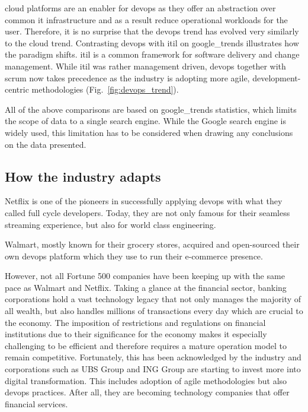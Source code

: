 \documentclass[../main.tex]{subfiles}
\begin{document}
    \Gls{cloud} platforms are an enabler for \gls{devops} as they offer an abstraction over common \acrshort{it} infrastructure and as a result reduce operational workloads for the user.
    Therefore, it is no surprise that the \gls{devops} trend has evolved very similarly to the \gls{cloud} trend.
    Contrasting \gls{devops} with \gls{itil} on \gls{google_trends} illustrates how the paradigm shifts.
    \gls{itil} is a common framework for software delivery and change management.
    While \gls{itil} was rather management driven, \gls{devops} together with \Gls{scrum} now takes precedence as the industry is adopting more agile, development-centric methodologies (Fig.~\ref{fig:devops_trend}).

    All of the above comparisons are based on \gls{google_trends} statistics, which limits the scope of data to a single search engine.
    While the Google search engine is widely used, this limitation has to be considered when drawing any conclusions on the data presented.

    \subsection{How the industry adapts}
    \label{subsec:intro-industry}

    Netflix is one of the pioneers in successfully applying \gls{devops} with what they called full cycle developers.
    Today, they are not only famous for their seamless streaming experience, but also for world class engineering.\cite{netflix_blog_fcdev}

    Walmart, mostly known for their grocery stores, acquired and open-sourced their own \gls{devops} platform which they use to run their e-commerce presence.\cite{walmart_blog_oneops}

    However, not all Fortune 500 companies have been keeping up with the same pace as Walmart and Netflix.
    Taking a glance at the financial sector, banking corporations hold a vast technology legacy that not only manages the majority of all wealth, but also handles millions of transactions every day which are crucial to the economy.
    The imposition of restrictions and regulations on financial institutions due to their significance for the economy makes it especially challenging to be efficient and therefore requires a mature operation model to remain competitive.
    Fortunately, this has been acknowledged by the industry and corporations such as UBS Group and ING Group are starting to invest more into digital transformation.
    This includes adoption of agile methodologies but also \gls{devops} practices.
    After all, they are becoming technology companies that offer financial services.\cite{ing_blog_agile,infoq_ubs_agile}
\end{document}
